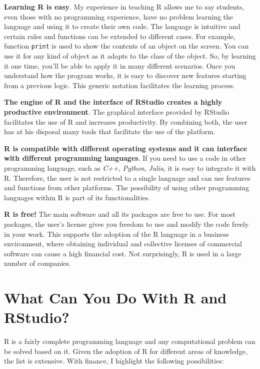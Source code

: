 \documentclass[11pt,]{book}
\begin{document}
\textbf{Learning R is easy}. My experience in teaching R allows me to
say students, even those with no programming experience, have no problem
learning the language and using it to create their own code. The
language is intuitive and certain rules and functions can be extended to
different cases. For example, function \texttt{print} is used to show
the contents of an object on the screen. You can use it for any kind of
object as it adapts to the class of the object. So, by learning it one
time, you'll be able to apply it in many different scenarios. Once you
understand how the program works, it is easy to discover new features
starting from a previous logic. This generic notation facilitates the
learning process.

\textbf{The engine of R and the interface of RStudio creates a highly
productive environment}. The graphical interface provided by RStudio
facilitates the use of R and increases productivity. By combining both,
the user has at his disposal many tools that facilitate the use of the
platform. 

\textbf{R is compatible with different operating systems and it can
interface with different programming languages}. If you need to use a
code in other programming language, such as \emph{C++}, \emph{Python},
\emph{Julia}, it is easy to integrate it with R. Therefore, the user is
not restricted to a single language and can use features and functions
from other platforms. The possibility of using other programming
languages within R is part of its functionalities. 
 

\textbf{R is free!} The main software and all its packages are free to
use. For most packages, the user's license gives you freedom to use and
modify the code freely in your work. This supports the adoption of the R
language in a business environment, where obtaining individual and
collective licenses of commercial software can cause a high financial
cost. Not surprisingly, R is used in a large number of companies.

\section{What Can You Do With R and
RStudio?}\label{what-can-you-do-with-r-and-rstudio}

R is a fairly complete programming language and any computational
problem can be solved based on it. Given the adoption of R for different
areas of knowledge, the list is extensive. With finance, I highlight the
following possibilities:
\end{document}
